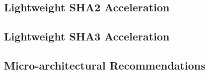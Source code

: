 \todo{}


\subsection{Lightweight SHA2 Acceleration}

\todo{}


\subsection{Lightweight SHA3 Acceleration}

\todo{}


\subsection{Micro-architectural Recommendations}



